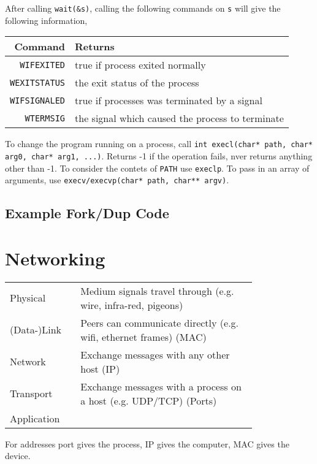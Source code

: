 \documentclass[a4]{article}
\begin{document}
\begin{multicols*}{3}
	After calling \texttt{wait(\&s)}, calling the following commands on \texttt{s} will give the following information,

	
			\begin{tabular}{r|l}
			Command & Returns\\\hline
			\texttt{WIFEXITED} & true if process exited normally\\
			\texttt{WEXITSTATUS} & the exit status of the process\\
			\texttt{WIFSIGNALED} & true if processes was terminated by a signal\\
			\texttt{WTERMSIG} & the signal which caused the process to terminate\\
			\end{tabular}

		To change the program running on a process, call \texttt{int execl(char* path, char* arg0, char* arg1, ...)}. Returns -1 if the operation fails, nver returns anything other than -1. To consider the contets of \texttt{PATH} use \texttt{execlp}. To pass in an array of arguments, use \texttt{execv/execvp(char* path, char** argv)}.


		\subsection{Example Fork/Dup Code}
		\label{sub:example_fork_dup_code}

		

		\section{Networking}
		\label{sec:networking}

		\begin{tabular}{p{0.2\linewidth}|p{0.6\linewidth}}
			Physical & Medium signals travel through (e.g. wire, infra-red, pigeons)\\
			(Data-)Link & Peers can communicate directly (e.g. wifi, ethernet frames) (MAC)\\
			Network & Exchange messages with any other host (IP)\\
			Transport & Exchange messages with a process on a host (e.g. UDP/TCP) (Ports)\\
			Application &\\
		\end{tabular}

		For addresses port gives the process, IP gives the computer, MAC gives the device.


\end{multicols*}
\end{document}
